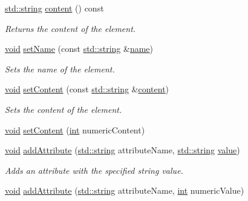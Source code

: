 \begin{DoxyCompactItemize}
\hyperlink{glew_8h_ae84541b4f3d8e1ea24ec0f466a8c568b}{std\-::string} \hyperlink{class_xml_element_a3fea4e46ca4e63ceb905a96a8f304381}{content} () const 
\begin{DoxyCompactList}\small\item\em Returns the content of the element. \end{DoxyCompactList}\item 
\hyperlink{wglew_8h_aeea6e3dfae3acf232096f57d2d57f084}{void} \hyperlink{class_xml_element_a0ed6ad08fd972865cca13ae2594fedda}{set\-Name} (const \hyperlink{glew_8h_ae84541b4f3d8e1ea24ec0f466a8c568b}{std\-::string} \&\hyperlink{fmod__codec_8h_a5c4947d4516dd7cfa3505ce3a648a4ef}{name})
\begin{DoxyCompactList}\small\item\em Sets the name of the element. \end{DoxyCompactList}\item 
\hyperlink{wglew_8h_aeea6e3dfae3acf232096f57d2d57f084}{void} \hyperlink{class_xml_element_aaf32abf7cdaf31b8896f52a7859d9826}{set\-Content} (const \hyperlink{glew_8h_ae84541b4f3d8e1ea24ec0f466a8c568b}{std\-::string} \&\hyperlink{class_xml_element_a3fea4e46ca4e63ceb905a96a8f304381}{content})
\begin{DoxyCompactList}\small\item\em Sets the content of the element. \end{DoxyCompactList}\item 
\hyperlink{wglew_8h_aeea6e3dfae3acf232096f57d2d57f084}{void} \hyperlink{class_xml_element_ae8d473f1d193157158ae36e12929d387}{set\-Content} (\hyperlink{wglew_8h_a500a82aecba06f4550f6849b8099ca21}{int} numeric\-Content)
\item 
\hyperlink{wglew_8h_aeea6e3dfae3acf232096f57d2d57f084}{void} \hyperlink{class_xml_element_a14387be9ca6d014a38e95a7aa98f86c5}{add\-Attribute} (\hyperlink{glew_8h_ae84541b4f3d8e1ea24ec0f466a8c568b}{std\-::string} attribute\-Name, \hyperlink{glew_8h_ae84541b4f3d8e1ea24ec0f466a8c568b}{std\-::string} \hyperlink{fmod__dsp_8h_a6a4f8a1a444e9080b297963b3db29fe0}{value})
\begin{DoxyCompactList}\small\item\em Adds an attribute with the specified string value. \end{DoxyCompactList}\item 
\hyperlink{wglew_8h_aeea6e3dfae3acf232096f57d2d57f084}{void} \hyperlink{class_xml_element_aec69fb49cf9e563cff9858ddc818f055}{add\-Attribute} (\hyperlink{glew_8h_ae84541b4f3d8e1ea24ec0f466a8c568b}{std\-::string} attribute\-Name, \hyperlink{wglew_8h_a500a82aecba06f4550f6849b8099ca21}{int} numeric\-Value)

\end{DoxyCompactItemize}
